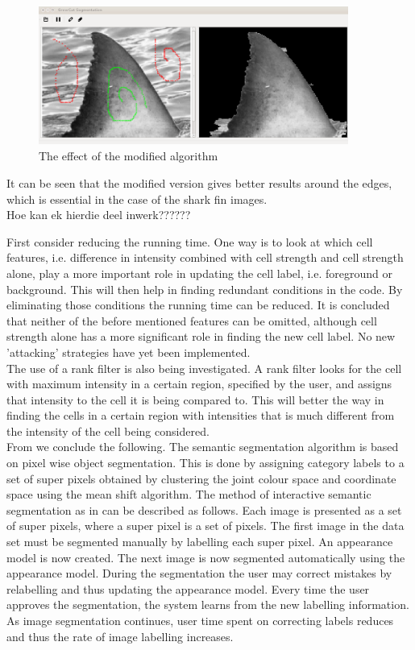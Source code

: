 \documentclass[a4paper,10pt]{article}
\begin{document}
\begin{figure}[H]
 \centering
 \includegraphics[width=4in, height=1.8in]{haaim}
 \caption{The effect of the modified algorithm}
 \label{fin}
\end{figure}

\noindent It can be seen that the modified version gives better results around
the edges, which is essential in the case of the shark fin images. \\ 

Hoe kan ek hierdie deel inwerk??????

First consider reducing the running time.  One way is to look at which cell
features, i.e. difference in intensity combined with cell strength and cell
strength alone, play a more important role in updating the cell label, i.e.
foreground or background.   This will then help in finding 
redundant conditions in the code.  By eliminating those conditions the running
time can be reduced.  It is concluded that neither of the before
mentioned features can be omitted, although cell strength alone has a more
significant role in finding the new cell label.  No new 'attacking' 
strategies have yet been implemented. \\

The use of a rank filter is also being investigated.  A rank filter looks for
the cell with maximum intensity in a certain region, specified by the user, 
and assigns that intensity to the cell it is being compared to.  This will
better the way in finding the cells in a certain region with intensities that
is much different from the intensity of the cell being considered. \\  

\noindent From \cite{RF} we conclude the following.  The semantic segmentation
algorithm is based on pixel wise object segmentation.  This is done by 
assigning category labels to a set of super pixels obtained by clustering the
joint colour space and coordinate space using the mean shift algorithm.
The method of interactive semantic segmentation as in \cite{RF} can be described
as follows.  Each image is presented as a set of super pixels, where 
a super pixel is a set of pixels.  The first image in the data set must be
segmented manually by labelling each super pixel.  An appearance model is 
now created.  The next image is now segmented automatically using the appearance
model.  During the segmentation the user may correct mistakes by 
relabelling and thus updating the appearance model.  Every time the user
approves the segmentation, the system learns from the new labelling information.
As image segmentation continues, user time spent on correcting labels reduces
and thus the rate of image labelling increases.  \\
\end{document}
